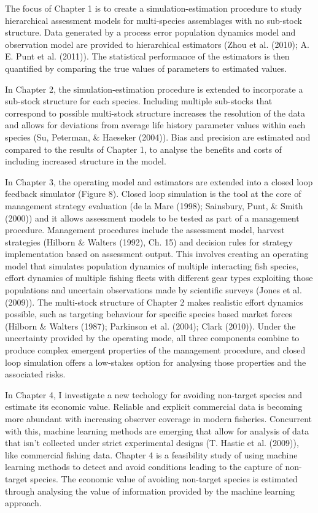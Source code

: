 \documentclass[12pt,]{scrartcl}
\begin{document}
The focus of Chapter 1 is to create a simulation-estimation procedure to
study hierarchical assessment models for multi-species assemblages with
no sub-stock structure. Data generated by a process error population
dynamics model and observation model are provided to hierarchical
estimators (Zhou et al. (2010); A. E. Punt et al. (2011)). The
statistical performance of the estimators is then quantified by
comparing the true values of parameters to estimated values.

In Chapter 2, the simulation-estimation procedure is extended to
incorporate a sub-stock structure for each species. Including multiple
sub-stocks that correspond to possible multi-stock structure increases
the resolution of the data and allows for deviations from average life
history parameter values within each species (Su, Peterman, \& Haeseker
(2004)). Bias and precision are estimated and compared to the results of
Chapter 1, to analyse the benefits and costs of including increased
structure in the model.

In Chapter 3, the operating model and estimators are extended into a
closed loop feedback simulator (Figure 8). Closed loop simulation is the
tool at the core of management strategy evaluation (de la Mare (1998);
Sainsbury, Punt, \& Smith (2000)) and it allows assessment models to be
tested as part of a management procedure. Management procedures include
the assessment model, harvest strategies (Hilborn \& Walters (1992), Ch.
15) and decision rules for strategy implementation based on assessment
output. This involves creating an operating model that simulates
population dynamics of multiple interacting fish species, effort
dynamics of multiple fishing fleets with different gear types exploiting
those populations and uncertain observations made by scientific surveys
(Jones et al. (2009)). The multi-stock structure of Chapter 2 makes
realistic effort dynamics possible, such as targeting behaviour for
specific species based market forces (Hilborn \& Walters (1987);
Parkinson et al. (2004); Clark (2010)). Under the uncertainty provided
by the operating mode, all three components combine to produce complex
emergent properties of the management procedure, and closed loop
simulation offers a low-stakes option for analysing those properties and
the associated risks.

In Chapter 4, I investigate a new techology for avoiding non-target
species and estimate its economic value. Reliable and explicit
commercial data is becoming more abundant with increasing observer
coverage in modern fisheries. Concurrent with this, machine learning
methods are emerging that allow for analysis of data that isn't
collected under strict experimental designs (T. Hastie et al. (2009)),
like commercial fishing data. Chapter 4 is a feasibility study of using
machine learning methods to detect and avoid conditions leading to the
capture of non-target species. The economic value of avoiding non-target
species is estimated through analysing the value of information provided
by the machine learning approach.
\end{document}
